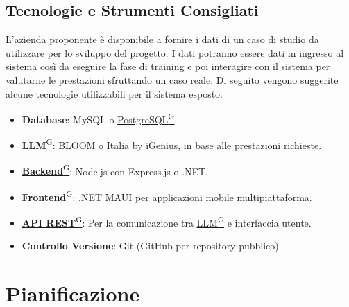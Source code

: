 \documentclass{article}
\begin{document}
    \subsection{Tecnologie e Strumenti Consigliati}
    L’azienda proponente è disponibile a fornire i dati di un caso di studio da utilizzare
    per lo sviluppo del progetto. I dati potranno essere dati in ingresso al sistema così da eseguire la fase di
    training e poi interagire con il sistema per valutarne le prestazioni sfruttando un caso reale.
    Di seguito vengono suggerite alcune tecnologie utilizzabili per il sistema esposto:
    \begin{itemize}
        \item \textbf{Database}: MySQL o \href{https://code7crusaders.github.io/docs/PB/documentazione_interna/glossario.html#postgresql}{PostgreSQL\textsuperscript{G}}.
        \item \href{https://code7crusaders.github.io/docs/PB/documentazione_interna/glossario.html#llm-large-language-model}{\textbf{LLM}\textsuperscript{G}}: BLOOM o Italia by iGenius, in base alle prestazioni richieste.
        \item \href{https://code7crusaders.github.io/docs/PB/documentazione_interna/glossario.html#backend}{\textbf{Backend}\textsuperscript{G}}: Node.js con Express.js o .NET.
        \item \href{https://code7crusaders.github.io/docs/PB/documentazione_interna/glossario.html#frontend}{\textbf{Frontend}\textsuperscript{G}}: .NET MAUI per applicazioni mobile multipiattaforma.
        \item \href{https://code7crusaders.github.io/docs/PB/documentazione_interna/glossario.html#api-rest-representational-state-transfer}{\textbf{API REST}\textsuperscript{G}}: Per la comunicazione tra \href{https://code7crusaders.github.io/docs/PB/documentazione_interna/glossario.html#llm-large-language-model}{LLM\textsuperscript{G}} e interfaccia utente.
        \item \textbf{Controllo Versione}: Git (GitHub per repository pubblico).
    \end{itemize}




\newpage
\section{Pianificazione}
\end{document}
